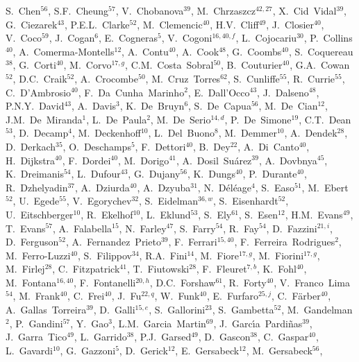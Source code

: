 \begin{flushleft}
S.~Chen$^{56}$,
S.F.~Cheung$^{57}$,
V.~Chobanova$^{39}$,
M.~Chrzaszcz$^{42,27}$,
X.~Cid~Vidal$^{39}$,
G.~Ciezarek$^{43}$,
P.E.L.~Clarke$^{52}$,
M.~Clemencic$^{40}$,
H.V.~Cliff$^{49}$,
J.~Closier$^{40}$,
V.~Coco$^{59}$,
J.~Cogan$^{6}$,
E.~Cogneras$^{5}$,
V.~Cogoni$^{16,40,f}$,
L.~Cojocariu$^{30}$,
P.~Collins$^{40}$,
A.~Comerma-Montells$^{12}$,
A.~Contu$^{40}$,
A.~Cook$^{48}$,
G.~Coombs$^{40}$,
S.~Coquereau$^{38}$,
G.~Corti$^{40}$,
M.~Corvo$^{17,g}$,
C.M.~Costa~Sobral$^{50}$,
B.~Couturier$^{40}$,
G.A.~Cowan$^{52}$,
D.C.~Craik$^{52}$,
A.~Crocombe$^{50}$,
M.~Cruz~Torres$^{62}$,
S.~Cunliffe$^{55}$,
R.~Currie$^{55}$,
C.~D'Ambrosio$^{40}$,
F.~Da~Cunha~Marinho$^{2}$,
E.~Dall'Occo$^{43}$,
J.~Dalseno$^{48}$,
P.N.Y.~David$^{43}$,
A.~Davis$^{3}$,
K.~De~Bruyn$^{6}$,
S.~De~Capua$^{56}$,
M.~De~Cian$^{12}$,
J.M.~De~Miranda$^{1}$,
L.~De~Paula$^{2}$,
M.~De~Serio$^{14,d}$,
P.~De~Simone$^{19}$,
C.T.~Dean$^{53}$,
D.~Decamp$^{4}$,
M.~Deckenhoff$^{10}$,
L.~Del~Buono$^{8}$,
M.~Demmer$^{10}$,
A.~Dendek$^{28}$,
D.~Derkach$^{35}$,
O.~Deschamps$^{5}$,
F.~Dettori$^{40}$,
B.~Dey$^{22}$,
A.~Di~Canto$^{40}$,
H.~Dijkstra$^{40}$,
F.~Dordei$^{40}$,
M.~Dorigo$^{41}$,
A.~Dosil~Su{\'a}rez$^{39}$,
A.~Dovbnya$^{45}$,
K.~Dreimanis$^{54}$,
L.~Dufour$^{43}$,
G.~Dujany$^{56}$,
K.~Dungs$^{40}$,
P.~Durante$^{40}$,
R.~Dzhelyadin$^{37}$,
A.~Dziurda$^{40}$,
A.~Dzyuba$^{31}$,
N.~D{\'e}l{\'e}age$^{4}$,
S.~Easo$^{51}$,
M.~Ebert$^{52}$,
U.~Egede$^{55}$,
V.~Egorychev$^{32}$,
S.~Eidelman$^{36,w}$,
S.~Eisenhardt$^{52}$,
U.~Eitschberger$^{10}$,
R.~Ekelhof$^{10}$,
L.~Eklund$^{53}$,
S.~Ely$^{61}$,
S.~Esen$^{12}$,
H.M.~Evans$^{49}$,
T.~Evans$^{57}$,
A.~Falabella$^{15}$,
N.~Farley$^{47}$,
S.~Farry$^{54}$,
R.~Fay$^{54}$,
D.~Fazzini$^{21,i}$,
D.~Ferguson$^{52}$,
A.~Fernandez~Prieto$^{39}$,
F.~Ferrari$^{15,40}$,
F.~Ferreira~Rodrigues$^{2}$,
M.~Ferro-Luzzi$^{40}$,
S.~Filippov$^{34}$,
R.A.~Fini$^{14}$,
M.~Fiore$^{17,g}$,
M.~Fiorini$^{17,g}$,
M.~Firlej$^{28}$,
C.~Fitzpatrick$^{41}$,
T.~Fiutowski$^{28}$,
F.~Fleuret$^{7,b}$,
K.~Fohl$^{40}$,
M.~Fontana$^{16,40}$,
F.~Fontanelli$^{20,h}$,
D.C.~Forshaw$^{61}$,
R.~Forty$^{40}$,
V.~Franco~Lima$^{54}$,
M.~Frank$^{40}$,
C.~Frei$^{40}$,
J.~Fu$^{22,q}$,
W.~Funk$^{40}$,
E.~Furfaro$^{25,j}$,
C.~F{\"a}rber$^{40}$,
A.~Gallas~Torreira$^{39}$,
D.~Galli$^{15,e}$,
S.~Gallorini$^{23}$,
S.~Gambetta$^{52}$,
M.~Gandelman$^{2}$,
P.~Gandini$^{57}$,
Y.~Gao$^{3}$,
L.M.~Garcia~Martin$^{69}$,
J.~Garc{\'\i}a~Pardi{\~n}as$^{39}$,
J.~Garra~Tico$^{49}$,
L.~Garrido$^{38}$,
P.J.~Garsed$^{49}$,
D.~Gascon$^{38}$,
C.~Gaspar$^{40}$,
L.~Gavardi$^{10}$,
G.~Gazzoni$^{5}$,
D.~Gerick$^{12}$,
E.~Gersabeck$^{12}$,
M.~Gersabeck$^{56}$,

\end{flushleft}
